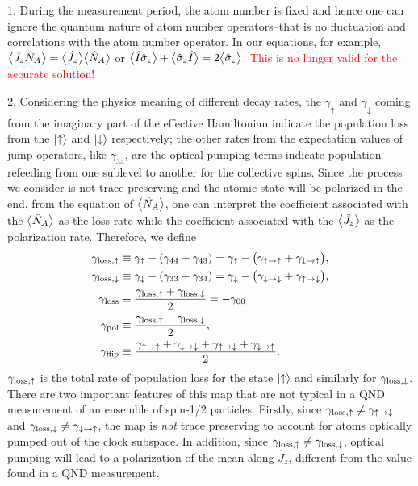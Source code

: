 1. During the measurement period, the atom number is fixed and hence one can ignore the quantum nature of atom number operators--that is no fluctuation and correlations with the atom number operator. In our equations, for example, $ \big\langle \hat{J}_z\hat{N}_A \big\rangle=\big\langle \hat{J}_z \big\rangle\big\langle \hat{N}_A \big\rangle $ or $ \big\langle \hat{I}\hat{\sigma}_z \big\rangle+\big\langle \hat{\sigma}_z\hat{I} \big\rangle=2\big\langle \hat{\sigma}_z \big\rangle $. \textcolor{red}{This is no longer valid for the accurate solution!}

2. Considering the physics meaning of different decay rates, the $ \gamma_\uparrow $ and $ \gamma_\downarrow $ coming from the imaginary part of the effective Hamiltonian indicate the population loss from the $ \lvert{\uparrow}\rangle $ and $ \lvert{\downarrow}\rangle $ respectively; the other rates from the expectation values of jump operators, like $ \gamma_{34} $, are the optical pumping terms indicate population refeeding from one sublevel to another for the collective spins. Since the process we consider is not trace-preserving and the atomic state will be polarized in the end, from the equation of $ \big\langle \hat{N}_A \big\rangle $, one can interpret the coefficient associated with the $ \big\langle \hat{N}_A \big\rangle $ as the loss rate while the coefficient associated with the $ \big\langle \hat{J}_z \big\rangle $ as the polarization rate. Therefore, we define
\begin{align}
\gamma_{\rm{loss},\uparrow} &\equiv \gamma_\uparrow - (\gamma_{44}+\gamma_{43})=\gamma_\uparrow - \big(\gamma_{\uparrow \rightarrow \uparrow} + \gamma_{\downarrow \rightarrow \uparrow} \big), \\
\gamma_{\rm{loss},\downarrow} &\equiv \gamma_\downarrow - (\gamma_{33}+\gamma_{34})=\gamma_\downarrow - \big(\gamma_{\downarrow \rightarrow \downarrow} + \gamma_{\uparrow \rightarrow \downarrow} \big),\\
\gamma_{\rm loss} &\equiv \frac{\gamma_{\rm{loss},\uparrow} +\gamma_{\rm{loss},\downarrow}}{2}=-\gamma_{00}\\
\gamma_{\rm pol} &\equiv \frac{\gamma_{\rm{loss},\uparrow} - \gamma_{\rm{loss},\downarrow}}{2},\\
\gamma_{\rm flip} &\equiv \frac{\gamma_{\uparrow \rightarrow \uparrow} + \gamma_{\downarrow \rightarrow \downarrow} + \gamma_{\uparrow \rightarrow \downarrow} + \gamma_{\downarrow \rightarrow \uparrow}}{2}.
\end{align}
$ \gamma_{\rm{loss},\uparrow} $ is the total rate of population loss for the state $\lvert{\uparrow}\rangle$ and similarly for $\gamma_{\rm{loss},\downarrow}$.
There are two important features of this map that are not typical in a QND measurement of an ensemble of spin-1/2 particles.  Firstly, since $\gamma_{\rm{loss},\uparrow} \neq \gamma_{\uparrow \rightarrow \downarrow}$ and  $\gamma_{\rm{loss},\downarrow} \neq \gamma_{\downarrow \rightarrow \uparrow}$, the map is {\em not} trace preserving to account for atoms optically pumped out of the clock subspace.  
In addition, since $\gamma_{\rm{loss},\uparrow} \neq \gamma_{\rm{loss},\downarrow}$, optical pumping will lead to a polarization of the mean along $\hat{J}_z$, different from the value found in a QND measurement.

